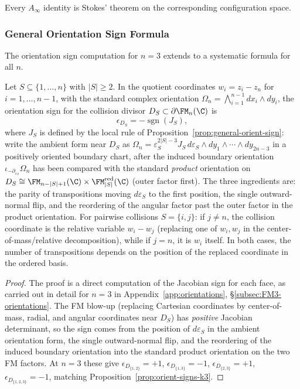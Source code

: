 Every $A_\infty$ identity is Stokes' theorem on the corresponding configuration space.

\subsubsection{General Orientation Sign Formula}

The orientation sign computation for $n=3$ extends to a systematic formula for all $n$.

\begin{proposition}
\label{prop:general_sign_formula}
Let $S \subseteq \{1,\ldots,n\}$ with $|S| \geq 2$. In the quotient coordinates $w_i = z_i - z_n$ for $i = 1,\ldots,n-1$, with the standard complex orientation $\Omega_n = \bigwedge_{i=1}^{n-1} dx_i \wedge dy_i$, the orientation sign for the collision divisor $D_S \subset \partial\FM_n(\C)$ is
\begin{equation}
\label{eq:general_sign_fm_calculus}
\epsilon_{D_S}=-\operatorname{sgn}(J_S),
\end{equation}
where \(J_S\) is defined by the local rule of
Proposition~\ref{prop:general-orient-sign}: write the ambient form near
\(D_S\) as
\(\Omega_n=\varepsilon_S^{2|S|-3}J_S\,d\varepsilon_S
\wedge dy_1\wedge\cdots\wedge dy_{2n-3}\) in a positively oriented
boundary chart, after the induced boundary orientation
\(\iota_{-\partial_{\varepsilon_S}}\Omega_n\) has been compared with
the standard \emph{product} orientation on
\(D_S\cong\FM_{n-|S|+1}(\C)\times\FM_{|S|}^{\mathrm{red}}(\C)\)
(outer factor first). The three ingredients are: the parity of
transpositions moving \(d\varepsilon_S\) to the first position, the
single outward-normal flip, and the reordering of the angular factor
past the outer factor in the product orientation.
	For pairwise collisions $S = \{i,j\}$: if $j \neq n$, the collision coordinate is the relative variable $w_i - w_j$ (replacing one of $w_i, w_j$ in the center-of-mass/relative decomposition), while if $j = n$, it is $w_i$ itself. In both cases, the number of transpositions depends on the position of the replaced coordinate in the ordered basis.
\end{proposition}

\begin{proof}
The proof is a direct computation of the Jacobian sign for each face, as carried out in detail for $n = 3$ in Appendix~\ref{app:orientations}, \S\ref{subsec:FM3-orientations}. The FM blow-up (replacing Cartesian coordinates by center-of-mass, radial, and angular coordinates near $D_S$) has \emph{positive} Jacobian determinant, so the sign comes from the position of $d\varepsilon_S$ in the ambient orientation form, the single outward-normal flip, and the reordering of the induced boundary orientation into the standard product orientation on the two FM factors. At $n=3$ these give $\epsilon_{D_{\{1,2\}}} = +1$, $\epsilon_{D_{\{1,3\}}} = -1$, $\epsilon_{D_{\{2,3\}}} = +1$, $\epsilon_{D_{\{1,2,3\}}} = -1$, matching Proposition~\ref{prop:orient-signs-k3}.
\end{proof}

